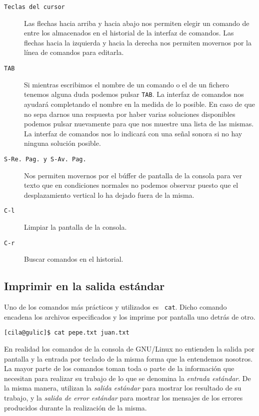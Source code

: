 \begin{description}

\item[{\tt Teclas del cursor}] Las  flechas hacia arriba y hacia abajo
nos  permiten  elegir  un  comando  de entre  los  almacenados  en  el
historial de la interfaz de comandos. Las flechas hacia la izquierda y
hacia la derecha  nos permiten movernos por la línea  de comandos para
editarla.

\item[{\tt TAB}] Si  mientras escribimos el nombre de un  comando o el
de  un  fichero tenemos  alguna  duda  podemos  pulsar {\tt  TAB}.  La
interfaz de comandos nos ayudará completando el nombre en la medida de
lo posible.  En caso  de que  no sepa darnos  una respuesta  por haber
varias soluciones  disponibles podemos pulsar nuevamente  para que nos
muestre  una lista  de  las mismas.  La interfaz  de  comandos nos  lo
indicará con una señal sonora si no hay ninguna solución posible.

\item[{\tt  S-Re. Pag.  y S-Av.  Pag.}] Nos  permiten movernos  por el
búffer de  pantalla de la  consola para  ver texto que  en condiciones
normales no podemos observar puesto  que el desplazamiento vertical lo
ha dejado fuera de la misma.

\item[{\tt C-l}] Limpiar la pantalla de la consola.

\item[{\tt C-r}] Buscar comandos en el historial.

\end{description}

\subsection{Imprimir en la salida estándar}

Uno   de   los  comandos   más   prácticos   y  utilizados   es   {\tt
cat}.   Dicho   comando  encadena   los   archivos
especificados y los imprime por pantalla uno detrás de otro.

\begin{verbatim}
[cila@gulic]$ cat pepe.txt juan.txt
\end{verbatim}

En realidad los comandos de la consola de GNU/Linux no entienden la
salida por pantalla y la entrada por teclado de la misma forma que la
entendemos nosotros. La mayor parte de los comandos toman toda o parte
de la información que necesitan para realizar su trabajo de lo que se
denomina la {\em entrada estándar}.  De la misma manera, utilizan la
{\em salida estándar} para mostrar los resultado de su trabajo, y la
{\em salida de error estándar} para mostrar los mensajes de los
errores producidos durante la realización de la misma.

